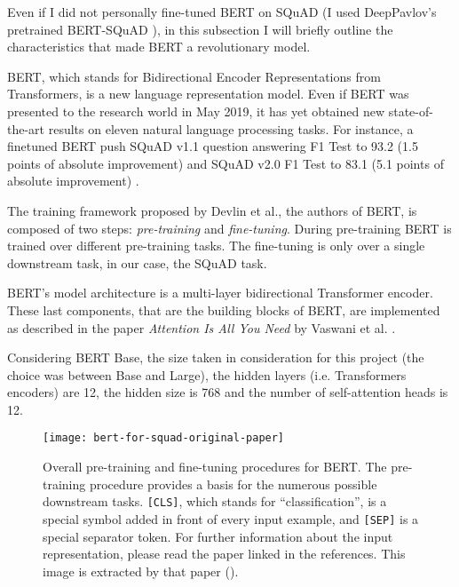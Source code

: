 Even if I did not personally fine-tuned BERT on SQuAD (I used DeepPavlov's pretrained BERT-SQuAD \cite{deeppavlov}), in this subsection I will briefly outline the characteristics that made BERT a revolutionary model.

BERT, which stands for Bidirectional Encoder Representations from Transformers, is a new language representation model. Even if BERT was presented to the research world in May 2019, it has yet obtained new state-of-the-art results on eleven natural language processing tasks. For instance, a finetuned BERT push SQuAD v1.1 question answering F1 Test to 93.2 (1.5 points of absolute improvement) and SQuAD v2.0 F1 Test to 83.1 (5.1 points of absolute improvement) \cite{bert}.

The training framework proposed by Devlin et al., the authors of BERT, is composed of two steps: \textit{pre-training} and \textit{fine-tuning}. During pre-training BERT is trained over different pre-training tasks. The fine-tuning is only over a single downstream task, in our case, the SQuAD task.

BERT’s  model  architecture is a multi-layer bidirectional Transformer encoder. These last components, that are the building blocks of BERT, are implemented as described in the paper \textit{Attention Is All You Need} by Vaswani et al. \cite{attentionisallyouneed}.

Considering BERT Base, the size taken in consideration for this project (the choice was between Base and Large), the hidden layers (i.e. Transformers encoders) are 12, the hidden size is 768 and the number of self-attention heads is 12.

\begin{figure}[t]
\centering
\texttt{[image: bert-for-squad-original-paper]}
\caption{Overall pre-training and fine-tuning procedures for BERT. The pre-training procedure provides a basis for the numerous possible downstream tasks. \texttt{[CLS]}, which stands for ``classification'', is a special symbol added in front of every input example, and \texttt{[SEP]} is a special separator token. For further information about the input representation, please read the paper linked in the references. This image is extracted by that paper (\cite{bert}).}
\medskip
\label{fig:bertsquad}
\end{figure}

